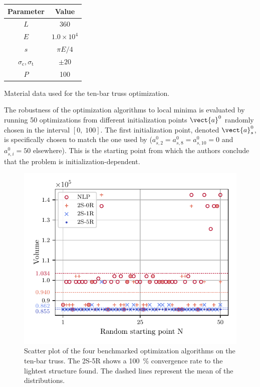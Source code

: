 \begin{margintable}
    \small
    \centering
    \begin{tabular}{cc}
    \toprule
    \textbf{Parameter}        & \textbf{Value} \\ \midrule
    $L$ & 360 \\
    $E$              & $1.0 \times 10^{4}$     \\
    $s$ & $\pi E/4$ \\
    $\sigma_\text{c}, \sigma_\text{t}$ & $\pm 20$ \\
    $P$              & 100   \\
    \bottomrule
    \end{tabular}
    \caption{Material data used for the ten-bar truss optimization.}
    \label{tab:04_10-bar_mat}
\end{margintable}

The robustness of the optimization algorithms to local minima is evaluated by running 50 optimizations from different initialization points $\vect{a}^0$ randomly chosen in the interval $[0,\;100]$. The first initialization point, denoted $\vect{a}^0_s$, is specifically chosen to match the one used by \cite{stolpe_note_2003} ($a_{s,2}^0=a_{s,8}^0=a_{s,10}^0=0$ and $a_{s,i}^0=50$ elsewhere). This is the starting point from which the authors conclude that the problem is initialization-dependent. 

\begin{figure}
    \centering
    \includegraphics{figures/04_TTO_improvements/09_Convergence_10bars/10bar-conv.pdf}
    \caption{Scatter plot of the four benchmarked optimization algorithms on the ten-bar truss. The 2S-5R shows a \qty{100}{\%} convergence rate to the lightest structure found. The dashed lines represent the mean of the distributions.}
    \label{fig:04_10_bar_convergence}
\end{figure}

